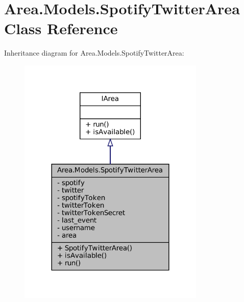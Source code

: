 \hypertarget{classArea_1_1Models_1_1SpotifyTwitterArea}{}\section{Area.\+Models.\+Spotify\+Twitter\+Area Class Reference}
\label{classArea_1_1Models_1_1SpotifyTwitterArea}


Inheritance diagram for Area.\+Models.\+Spotify\+Twitter\+Area\+:
\nopagebreak
\begin{figure}[H]
\begin{center}
\leavevmode
\includegraphics[width=252pt]{classArea_1_1Models_1_1SpotifyTwitterArea__inherit__graph}
\end{center}
\end{figure}


